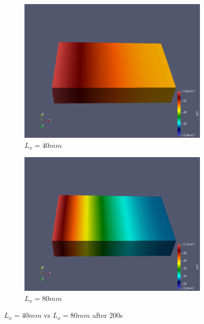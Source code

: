 \documentclass{article}
\begin{document}
\begin{figure}[H]
\begin{subfigure}{.5\textwidth}
  \centering
  \includegraphics[width=1\linewidth]{images/standart40_350s.png}
  \caption{$L_x=40mm$}
  \label{fig:sfig1}
\end{subfigure}
\begin{subfigure}{.5\textwidth}
  \centering
  \includegraphics[width=1\linewidth]{images/standard80_400s.png}
  \caption{$L_x=80mm$}
  \label{fig:sfig2}
\end{subfigure}
\caption{$L_x=40mm$ vs $L_x=80mm$ after 200s}
\label{fig:fig}
\end{figure}
\end{document}
